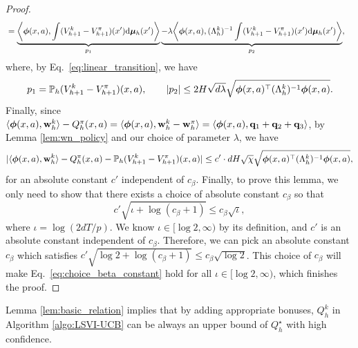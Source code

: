 \begin{proof}
\begin{align*}
&= \underbrace{\bigg \langle \bm{\phi}(x, a), \int (V^{k}_{h+1} - V^\pi_{h+1})(x') \mathrm{d} \bm{\mu}_h(x')\bigg \rangle}_{p_1}
\underbrace{-\lambda \bigg\langle \bm{\phi}(x, a), (\Lambda^k_h)^{-1}\int (V^{k}_{h+1} - V^\pi_{h+1})(x') \mathrm{d} \bm{\mu}_h(x') \bigg\rangle}_{p_2}, 
\end{align*}
where, by Eq.~\eqref{eq:linear_transition}, we have
\begin{align*}
p_1 = \mathbb{P}_h (V^{k}_{h+1} - V^\pi_{h+1})(x, a),  \qquad 
|p_2|  
\le 2 H \sqrt{d\lambda} \sqrt{\bm{\phi}(x, a)^{\top} (\Lambda^k_h)^{-1}  \bm{\phi}(x, a)}.
\end{align*}
Finally, since $\langle\bm{\phi}(x, a), \mathbf{w}^k_h\rangle - Q_h^\pi(x, a) = \langle \bm{\phi}(x, a), \mathbf{w}^k_h - \mathbf{w}^\pi_h\rangle =\langle \bm{\phi}(x, a), \mathbf{q}_1 + \mathbf{q}_2 + \mathbf{q}_3\rangle$, by Lemma \ref{lem:wn_policy} and our choice of parameter $\lambda$, we have
\begin{equation*}
|\langle\bm{\phi}(x, a), \mathbf{w}^k_h\rangle - Q_h^\pi(x, a)  -  \mathbb{P}_h (V^{k}_{h+1} - V^{\pi}_{h+1})(x, a)| \le c' \cdot dH\sqrt{\chi} \sqrt{\bm{\phi}(x, a)^{\top} (\Lambda^k_h)^{-1}  \bm{\phi}(x, a)},
\end{equation*}
for an absolute constant $c'$ independent of $c_{\beta}$. Finally, to prove this lemma, we only need to show that there exists a choice of absolute constant $c_\beta$ so that 
\begin{equation} \label{eq:choice_beta_constant}
c' \sqrt{\iota + \log(c_\beta + 1)} \le c_\beta \sqrt{\iota},
\end{equation}
where $\iota = \log (2dT/p)$. We know $\iota \in [\log 2, \infty)$ by its definition, and $c'$ is an absolute constant independent of $c_\beta$. Therefore, we can pick an absolute constant $c_\beta$ which satisfies 
$c'\sqrt{\log 2 + \log(c_\beta + 1)} \le c_\beta \sqrt{\log 2}$. This choice of $c_\beta$ will make Eq.~\eqref{eq:choice_beta_constant} hold for all $\iota \in [\log 2, \infty)$, which finishes the proof.
\end{proof}

Lemma \ref{lem:basic_relation} implies that by adding appropriate bonuses, $Q^k_h$ in Algorithm \ref{algo:LSVI-UCB} can be always an upper bound of $Q^\star_h$ with high confidence. 

